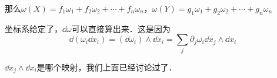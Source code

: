 那么$\omega(X)=f_1\omega_1+f_2\omega_2+\cdots+f_n\omega_n$，$\omega(Y)=g_1\omega_1+g_2\omega_2+\cdots+g_n\omega_n$

坐标系给定了，$\dd \omega$可以直接算出来．这是因为
\begin{equation}
\dd (\omega_i\dd x_i)=(\dd \omega_i)\wedge\dd x_i=\sum_{j}\partial_j\omega_i\dd x_j\wedge\dd x_i
\end{equation}

$\dd x_j\wedge\dd x_i$是哪个映射，我们上面已经讨论过了．

















